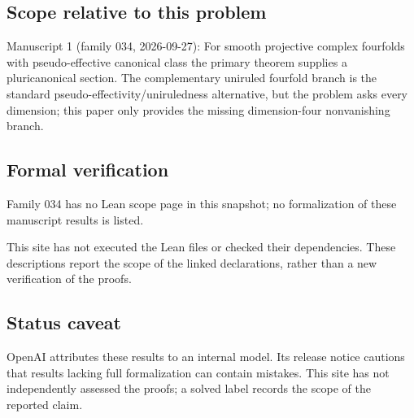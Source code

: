 \documentclass[11pt]{article}
\begin{document}
\subsection{Scope relative to this problem}
Manuscript 1 (family 034, 2026-09-27): For smooth projective complex fourfolds with pseudo-effective canonical class the primary theorem supplies a pluricanonical section. The complementary uniruled fourfold branch is the standard pseudo-effectivity/uniruledness alternative, but the problem asks every dimension; this paper only provides the missing dimension-four nonvanishing branch.

\subsection{Formal verification}
Family 034 has no Lean scope page in this snapshot; no formalization of these manuscript results is listed.

This site has not executed the Lean files or checked their dependencies. These descriptions report the scope of the linked declarations, rather than a new verification of the proofs.

\subsection{Status caveat}
OpenAI attributes these results to an internal model. Its release notice cautions that results lacking full formalization can contain mistakes. This site has not independently assessed the proofs; a solved label records the scope of the reported claim.
\end{document}
